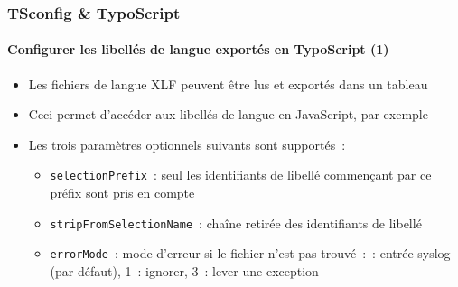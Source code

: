 \begin{frame}[fragile]
	\frametitle{TSconfig \& TypoScript}
	\framesubtitle{Configurer les libellés de langue exportés en TypoScript (1)}

	\lstset{basicstyle=\tiny\ttfamily}

	\begin{itemize}

		\item Les fichiers de langue XLF peuvent être lus et exportés dans un tableau

		\item Ceci permet d'accéder aux libellés de langue en JavaScript, par exemple

		\item Les trois paramètres optionnels suivants sont supportés~:

			\begin{itemize}
				\item \texttt{selectionPrefix}~:\newline
					seul les identifiants de libellé commençant par ce préfix sont pris en compte
				\item \texttt{stripFromSelectionName}~:\newline
					chaîne retirée des identifiants de libellé
				\item \texttt{errorMode}~:\newline
					mode d'erreur si le fichier n'est pas trouvé~:~: entrée syslog (par défaut), 1~: ignorer, 3~: lever une exception
			\end{itemize}

	\end{itemize}

\end{frame}

